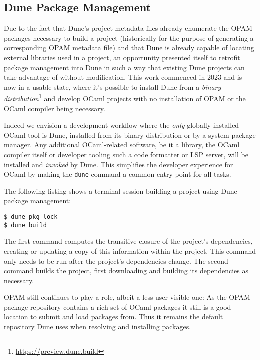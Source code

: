 \documentclass{article}
\begin{document}
\begin{multicols}{2}
        \section {Dune Package Management}

        Due to the fact that Dune's project metadata files already enumerate
        the OPAM packages necessary to build a project (historically for the
        purpose of generating a corresponding OPAM metadata file) and that Dune
        is already capable of locating external libraries used in a project, an
        opportunity presented itself to retrofit package management into Dune in
        such a way that existing Dune projects can take advantage of without
        modification. This work commenced in 2023 and is now in a usable state,
        where it's possible to install Dune from a \textit{binary
        distribution}\footnote{\url{https://preview.dune.build}} and develop OCaml
        projects with no installation of OPAM or the OCaml compiler being
        necessary.

        Indeed we envision a development workflow where the \textit{only}
        globally-installed OCaml tool is Dune, installed from its binary
        distribution or by a system package manager. Any additional
        OCaml-related software, be it a library, the OCaml compiler itself or
        developer tooling such a code formatter or LSP server, will be installed
        and \textit{invoked} by Dune. This simplifies the developer experience
        for OCaml by making the \texttt{dune} command a common entry point for all
        tasks.

        The following listing shows a terminal session building a project using
        Dune package management:
        \begin{lstlisting}
$ dune pkg lock
$ dune build
        \end{lstlisting}

        The first command computes the transitive closure of the project's
        dependencies, creating or updating a copy of this information within the
        project. This command only needs to be run after the project's
        dependencies change. The second command builds the project, first
        downloading and building its dependencies as necessary.

        OPAM still continues to play a role, albeit a less user-visible one: As
        the OPAM package repository contains a rich set of OCaml packages it
        still is a good location to submit and load packages from. Thus it
        remains the default repository Dune uses when resolving and installing
        packages.


\end{multicols}
\end{document}
